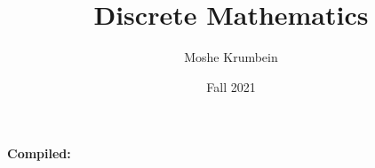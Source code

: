 
\usepackage{subfiles}
\title{Discrete Mathematics}
\author{Moshe Krumbein}
\date{Fall 2021}



\begin{titlepage}
    \centering
    {\huge\bfseries \thetitle\par}
    \vspace{2cm}
    {\Large \theauthor\par}
    {\large \thedate\par}
    \vfill
    \begin{center}
        \large{\textbf{Compiled:} \DTMnow}
    \end{center}
\end{titlepage}

\setcounter{tocdepth}{2}
\tableofcontents
\cleardoublepage















